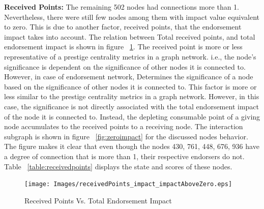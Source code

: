 \textbf{Received Points:}
The remaining 502 nodes had connections more than 1. Nevertheless, there were
still few nodes among them with impact value equivalent to zero. This is due to
another factor, received points, that the endorsement impact takes into
account. The relation between Total received points, and total endorsement
impact is shown in figure ~\ref{fig:receivedpointvsimpact}. The received point
is more or less representative of a prestige centrality metrics in a graph
network.  i.e., the node's significance is dependent on the significance of
other nodes it is connected to. However, in case of endorsement network,
Determines the significance of a node based on the significance of other nodes
it is connected to. This factor is more or less similar to the prestige
centrality metrics in a graph network. However, in this case, the significance
is not directly associated with the total endorsement impact of the node it is
connected to. Instead, the depleting consumable point of a giving node
accumulates to the received points to a receiving node. 
The interaction subgraph is shown in figure ~\ref{fig:zeroimpact} for the
discussed nodes behavior. The figure makes it clear that even though the nodes
430, 761, 448, 676, 936 have a degree of connection that is more than 1, their
respective endorsers do not. Table ~\ref{table:receivedpoints} displays the
state and scores of these nodes. 
\begin{figure}[h]
	\texttt{[image: Images/receivedPoints\_impact\_impactAboveZero.eps]}
	\caption{Received Points Vs. Total Endorsement Impact}
	\label{fig:receivedpointvsimpact}
\end{figure}


